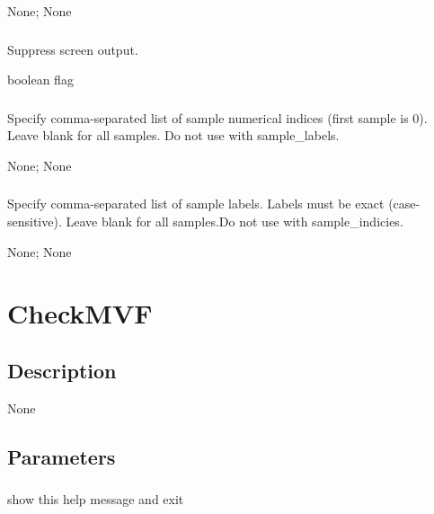 \documentclass[letterpaper,11pt,english]{sphinxmanual}
\begin{document}
 None;  None


\subsubsection{}
\label{\detokenize{prog_desc:id82}}
 Suppress screen output.

 boolean flag


\subsubsection{}
\label{\detokenize{prog_desc:id83}}
 Specify comma-separated list of sample numerical indices (first sample is 0). Leave blank for all samples. Do not use with \textendash{}sample\_labels.

 None;  None


\subsubsection{}
\label{\detokenize{prog_desc:id84}}
 Specify comma-separated list of sample labels. Labels must be exact (case-sensitive). Leave blank for all samples.Do not use with \textendash{}sample\_indicies.

 None;  None


\section{CheckMVF}
\label{\detokenize{prog_desc:checkmvf}}

\subsection{Description}
\label{\detokenize{prog_desc:id85}}
None


\subsection{Parameters}
\label{\detokenize{prog_desc:id86}}

\subsubsection{}
\label{\detokenize{prog_desc:id87}}
 show this help message and exit
\end{document}
